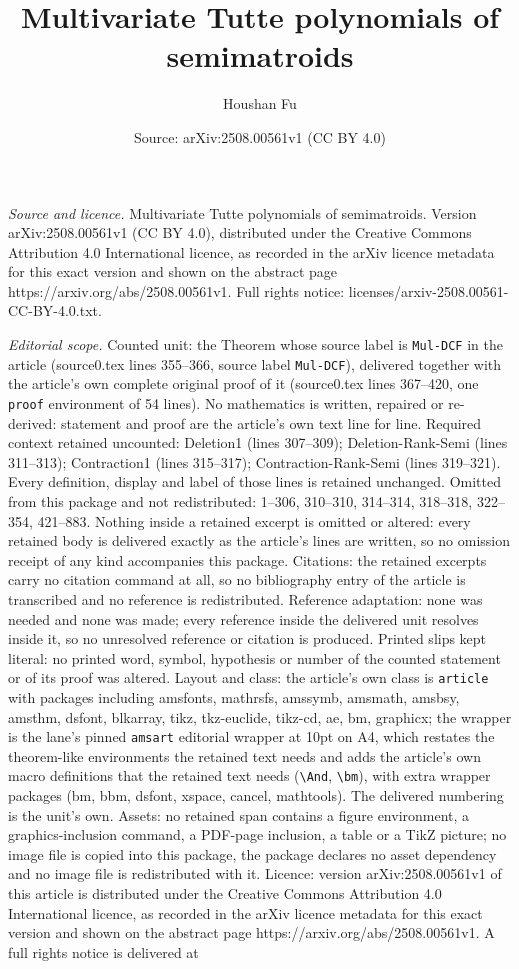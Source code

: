 \documentclass[10pt,a4paper]{amsart}
\title[Multivariate Tutte polynomials of semimatroids]{Multivariate Tutte polynomials of semimatroids}
\author{Houshan Fu}
\date{Source: arXiv:2508.00561v1 (CC BY 4.0)}
\begin{document}
\maketitle

\noindent\emph{Source and licence.} Multivariate Tutte polynomials of semimatroids. Version arXiv:2508.00561v1 (CC BY 4.0), distributed under the Creative Commons Attribution 4.0 International licence, as recorded in the arXiv licence metadata for this exact version and shown on the abstract page https://arxiv.org/abs/2508.00561v1. Full rights notice: licenses/arxiv-2508.00561-CC-BY-4.0.txt.\par\smallskip

\noindent\textit{Editorial scope.} Counted unit: the Theorem whose source label is \texttt{Mul-DCF} in the article (source0.tex lines 355--366, source label \texttt{Mul-DCF}), delivered together with the article's own complete original proof of it (source0.tex lines 367--420, one \texttt{proof} environment of 54 lines). No mathematics is written, repaired or re-derived: statement and proof are the article's own text line for line. Required context retained uncounted: Deletion1 (lines 307--309); Deletion-Rank-Semi (lines 311--313); Contraction1 (lines 315--317); Contraction-Rank-Semi (lines 319--321). Every definition, display and label of those lines is retained unchanged. Omitted from this package and not redistributed: 1--306, 310--310, 314--314, 318--318, 322--354, 421--883. Nothing inside a retained excerpt is omitted or altered: every retained body is delivered exactly as the article's lines are written, so no omission receipt of any kind accompanies this package. Citations: the retained excerpts carry no citation command at all, so no bibliography entry of the article is transcribed and no reference is redistributed. Reference adaptation: none was needed and none was made; every reference inside the delivered unit resolves inside it, so no unresolved reference or citation is produced. Printed slips kept literal: no printed word, symbol, hypothesis or number of the counted statement or of its proof was altered. Layout and class: the article's own class is \texttt{article} with packages including amsfonts, mathrsfs, amssymb, amsmath, amsbsy, amsthm, dsfont, blkarray, tikz, tkz-euclide, tikz-cd, ae, bm, graphicx; the wrapper is the lane's pinned \texttt{amsart} editorial wrapper at 10pt on A4, which restates the theorem-like environments the retained text needs and adds the article's own macro definitions that the retained text needs (\texttt{\textbackslash And}, \texttt{\textbackslash bm}), with extra wrapper packages (bm, bbm, dsfont, xspace, cancel, mathtools). The delivered numbering is the unit's own. Assets: no retained span contains a figure environment, a graphics-inclusion command, a PDF-page inclusion, a table or a TikZ picture; no image file is copied into this package, the package declares no asset dependency and no image file is redistributed with it. Licence: version arXiv:2508.00561v1 of this article is distributed under the Creative Commons Attribution 4.0 International licence, as recorded in the arXiv licence metadata for this exact version and shown on the abstract page https://arxiv.org/abs/2508.00561v1. A full rights notice is delivered at 
\end{document}
